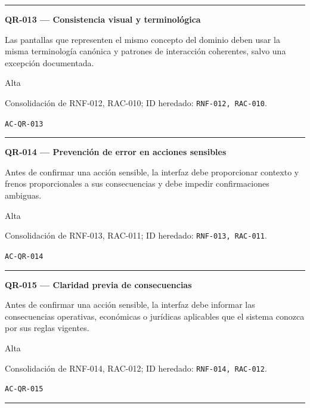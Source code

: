 \documentclass[10pt,letterpaper]{article}
\begin{document}
\vspace{0.25em}\hrule\vspace{0.65em}
\noindent\textbf{QR-013 --- Consistencia visual y terminológica}\par
\begin{description}[style=nextline,leftmargin=3.15cm,labelwidth=2.8cm,font=\normalfont\bfseries]
\item[Obligación] Las pantallas que representen el mismo concepto del dominio deben usar la misma terminología canónica y patrones de interacción coherentes, salvo una excepción documentada.
\item[Prioridad] Alta
\item[Procedencia] Consolidación de RNF-012, RAC-010; ID heredado: \texttt{RNF-012, RAC-010}.
\item[Verificación] \texttt{AC-QR-013}
\end{description}
\vspace{0.25em}\hrule\vspace{0.65em}
\noindent\textbf{QR-014 --- Prevención de error en acciones sensibles}\par
\begin{description}[style=nextline,leftmargin=3.15cm,labelwidth=2.8cm,font=\normalfont\bfseries]
\item[Obligación] Antes de confirmar una acción sensible, la interfaz debe proporcionar contexto y frenos proporcionales a sus consecuencias y debe impedir confirmaciones ambiguas.
\item[Prioridad] Alta
\item[Procedencia] Consolidación de RNF-013, RAC-011; ID heredado: \texttt{RNF-013, RAC-011}.
\item[Verificación] \texttt{AC-QR-014}
\end{description}
\vspace{0.25em}\hrule\vspace{0.65em}
\noindent\textbf{QR-015 --- Claridad previa de consecuencias}\par
\begin{description}[style=nextline,leftmargin=3.15cm,labelwidth=2.8cm,font=\normalfont\bfseries]
\item[Obligación] Antes de confirmar una acción sensible, la interfaz debe informar las consecuencias operativas, económicas o jurídicas aplicables que el sistema conozca por sus reglas vigentes.
\item[Prioridad] Alta
\item[Procedencia] Consolidación de RNF-014, RAC-012; ID heredado: \texttt{RNF-014, RAC-012}.
\item[Verificación] \texttt{AC-QR-015}
\end{description}
\vspace{0.25em}\hrule\vspace{0.65em}
\end{document}
